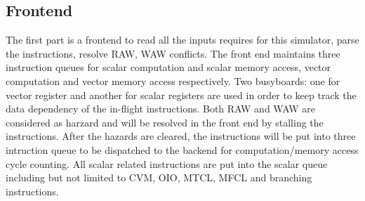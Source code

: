 \documentclass[conference]{IEEEtran}
\begin{document}
\subsection{Frontend}
The first part is a frontend to read all the inputs requires for this simulator, parse the instructions, resolve RAW, WAW conflicts. The front end maintains three instruction queues for scalar computation and scalar memory access, vector computation and vector memory access respectively. Two busyboards: one for vector register and another for scalar registers are used in order to keep track the data dependency of the in-flight instructions. Both RAW and WAW are considered as harzard and will be resolved in the front end by stalling the instructions. After the hazards are cleared, the instructions will be put into three intruction queue to be dispatched to the backend for computation/memory access cycle counting. All scalar related instructions are put into the scalar queue including but not limited to CVM, OIO, MTCL, MFCL and branching instructions. 
\end{document}
